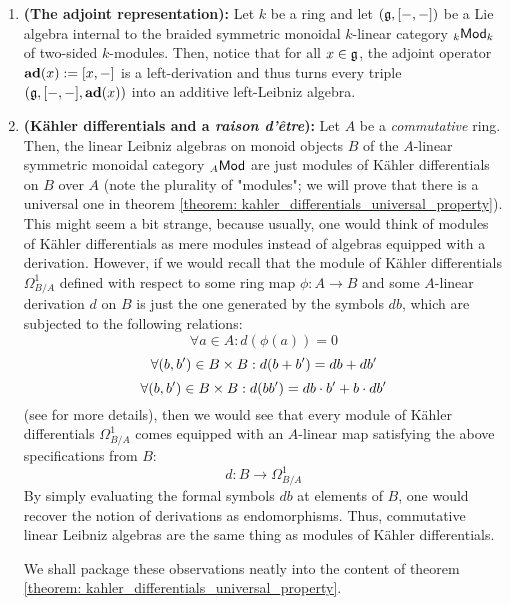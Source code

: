                 \begin{example} \label{example: derivations}
                    \noindent
                    \begin{enumerate}
                        \item \textbf{(The adjoint representation):} Let $k$ be a ring and let $\left(\mathfrak{g}, [-,-]\right)$ be a Lie algebra internal to the braided symmetric monoidal $k$-linear category ${}_k\mathsf{Mod}_k$ of two-sided $k$-modules. Then, notice that for all $x \in \mathfrak{g}$, the adjoint operator $\mathbf{ad}(x) := [x,-]$ is a left-derivation and thus turns every triple $\left(\mathfrak{g}, [-,-], \mathbf{ad}(x)\right)$ into an additive left-Leibniz algebra.
                        \item \textbf{(K\"ahler differentials and a \textit{raison d'\^etre}):} Let $A$ be a \textit{commutative} ring. Then, the linear Leibniz algebras on monoid objects $B$ of the $A$-linear symmetric monoidal category ${}_A\mathsf{Mod}$ are just modules of K\"ahler differentials on $B$ over $A$ (note the plurality of "modules"; we will prove that there is a universal one in theorem \ref{theorem: kahler_differentials_universal_property}). This might seem a bit strange, because usually, one would think of modules of K\"ahler differentials as mere modules instead of algebras equipped with a derivation. However, if we would recall that the module of K\"ahler differentials $\Omega^1_{B/A}$ defined with respect to some ring map $\phi: A \to B$ and some $A$-linear derivation $d$ on $B$ is just the one generated by the symbols $db$, which are subjected to the following relations:
                            $$\forall a \in A: d\left(\phi(a)\right) = 0$$
                            $$\forall (b, b') \in B \x B: d(b + b') = db + db'$$
                            $$\forall (b, b') \in B \x B: d(bb') = db \cdot b' + b \cdot db'$$
                        (see \cite[\href{https://stacks.math.columbia.edu/tag/00RM}{Tag 00RM}]{stacks} for more details), then we would see that every module of K\"ahler differentials $\Omega^1_{B/A}$ comes equipped with an $A$-linear map satisfying the above specifications from $B$:
                            $$d: B \to \Omega^1_{B/A}$$
                        By simply evaluating the formal symbols $db$ at elements of $B$, one would recover the notion of derivations as endomorphisms. Thus, commutative linear Leibniz algebras are the same thing as modules of K\"ahler differentials. 
                        
                        We shall package these observations neatly into the content of theorem \ref{theorem: kahler_differentials_universal_property}. 
                    \end{enumerate}
                \end{example}
